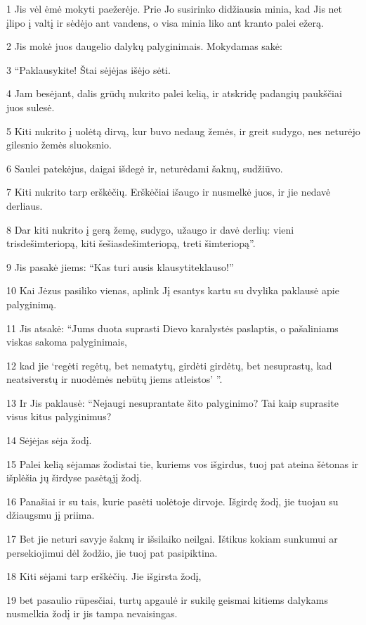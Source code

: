 \par 1 Jis vėl ėmė mokyti paežerėje. Prie Jo susirinko didžiausia minia, kad Jis net įlipo į valtį ir sėdėjo ant vandens, o visa minia liko ant kranto palei ežerą. 
\par 2 Jis mokė juos daugelio dalykų palyginimais. Mokydamas sakė: 
\par 3 “Paklausykite! Štai sėjėjas išėjo sėti. 
\par 4 Jam besėjant, dalis grūdų nukrito palei kelią, ir atskridę padangių paukščiai juos sulesė. 
\par 5 Kiti nukrito į uolėtą dirvą, kur buvo nedaug žemės, ir greit sudygo, nes neturėjo gilesnio žemės sluoksnio. 
\par 6 Saulei patekėjus, daigai išdegė ir, neturėdami šaknų, sudžiūvo. 
\par 7 Kiti nukrito tarp erškėčių. Erškėčiai išaugo ir nusmelkė juos, ir jie nedavė derliaus. 
\par 8 Dar kiti nukrito į gerą žemę, sudygo, užaugo ir davė derlių: vieni trisdešimteriopą, kiti šešiasdešimteriopą, treti šimteriopą”. 
\par 9 Jis pasakė jiems: “Kas turi ausis klausyti­teklauso!” 
\par 10 Kai Jėzus pasiliko vienas, aplink Jį esantys kartu su dvylika paklausė apie palyginimą. 
\par 11 Jis atsakė: “Jums duota suprasti Dievo karalystės paslaptis, o pašaliniams viskas sakoma palyginimais, 
\par 12 kad jie ‘regėti regėtų, bet nematytų, girdėti girdėtų, bet nesuprastų, kad neatsiverstų ir nuodėmės nebūtų jiems atleistos’ ”. 
\par 13 Ir Jis paklausė: “Nejaugi nesuprantate šito palyginimo? Tai kaip suprasite visus kitus palyginimus? 
\par 14 Sėjėjas sėja žodį. 
\par 15 Palei kelią sėjamas žodis­tai tie, kuriems vos išgirdus, tuoj pat ateina šėtonas ir išplėšia jų širdyse pasėtąjį žodį. 
\par 16 Panašiai ir su tais, kurie pasėti uolėtoje dirvoje. Išgirdę žodį, jie tuojau su džiaugsmu jį priima. 
\par 17 Bet jie neturi savyje šaknų ir išsilaiko neilgai. Ištikus kokiam sunkumui ar persekiojimui dėl žodžio, jie tuoj pat pasipiktina. 
\par 18 Kiti sėjami tarp erškėčių. Jie išgirsta žodį, 
\par 19 bet pasaulio rūpesčiai, turtų apgaulė ir sukilę geismai kitiems dalykams nusmelkia žodį ir jis tampa nevaisingas. 
